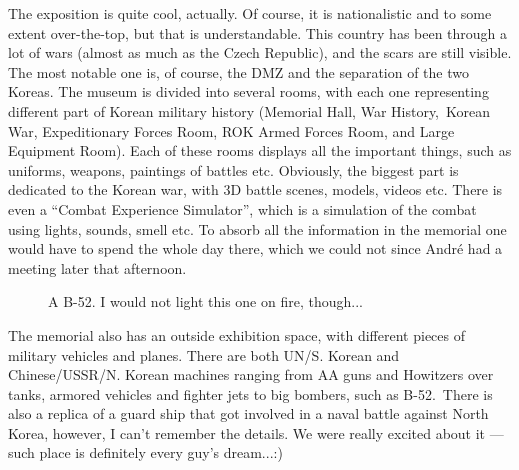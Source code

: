 \begin{post}
\begin{content}
The exposition is quite cool, actually. Of course, it is nationalistic and to some extent over-the-top, but that is understandable. This country has been through a lot of wars (almost as much as the Czech Republic), and the scars are still visible. The most notable one is, of course, the DMZ and the separation of the two Koreas. The museum is divided into several rooms, with each one representing different part of Korean military history (Memorial Hall, War History, Korean War, Expeditionary Forces Room, ROK Armed Forces Room, and Large Equipment Room). Each of these rooms displays all the important things, such as uniforms, weapons, paintings of battles etc. Obviously, the biggest part is dedicated to the Korean war, with 3D battle scenes, models, videos etc. There is even a ``Combat Experience Simulator'', which is a simulation of the combat using lights, sounds, smell etc. To absorb all the information in the memorial one would have to spend the whole day there, which we could not since André had a meeting later that afternoon.

\begin{figure}[!h]
\centering
{}
\caption{A B-52. I would not light this one on fire, though...}
\end{figure}

The memorial also has an outside exhibition space, with different pieces of military vehicles and planes. There are both UN/S. Korean and Chinese/USSR/N. Korean machines ranging from AA guns and Howitzers over tanks, armored vehicles and fighter jets to big bombers, such as B-52. There is also a replica of a guard ship that got involved in a naval battle against North Korea, however, I can't remember the details. We were really excited about it — such place is definitely every guy's dream...:)



\end{content}
\end{post}
